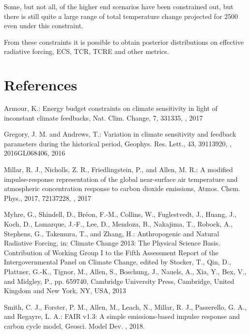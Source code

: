 \documentclass[letterpaper,10pt,english]{sphinxmanual}
\begin{document}
\noindent{}

Some, but not all, of the higher end scenarios have been constrained
out, but there is still quite a large range of total temperature change
projected for 2500 even under this constraint.

From these constraints it is possible to obtain posterior distributions
on effective radiative forcing, ECS, TCR, TCRE and other metrics.


\chapter{References}
\label{\detokenize{references:references}}\label{\detokenize{references::doc}}
Armour, K.: Energy budget constraints on climate sensitivity in light of inconstant climate feedbacks, Nat. Clim. Change, 7, 331\textendash{}335, , 2017

Gregory, J. M. and Andrews, T.: Variation in climate sensitivity and feedback parameters during the historical period, Geophys. Res. Lett.,
43, 3911\textendash{}3920, , 2016GL068406, 2016

Millar, R. J., Nicholls, Z. R., Friedlingstein, P., and Allen, M. R.: A modified impulse-response representation of the global near-surface air temperature and atmospheric concentration response to carbon dioxide emissions, Atmos. Chem. Phys., 2017, 7213\textendash{}7228,
, 2017

Myhre, G., Shindell, D., Bréon, F.-M., Collins, W., Fuglestvedt, J., Huang, J., Koch, D., Lamarque, J.-F., Lee, D., Mendoza, B., Nakajima, T., Robock, A., Stephens, G., Takemura, T., and Zhang, H.: Anthropogenic and Natural Radiative Forcing, in: Climate Change 2013: The Physical Science Basis. Contribution of Working Group I to the Fifth Assessment Report of the Intergovernmental Panel on Climate Change, edited by Stocker, T., Qin, D., Plattner, G.-K., Tignor, M., Allen, S., Boschung, J., Nauels, A., Xia, Y., Bex, V., and Midgley, P., pp. 659\textendash{}740, Cambridge University Press, Cambridge, United Kingdom and New York, NY, USA, 2013

Smith, C. J., Forster, P. M., Allen, M., Leach, N., Millar, R. J., Passerello, G. A., and Regayre, L. A.: FAIR v1.3: A simple emissions-based impulse response and carbon cycle model, Geosci. Model Dev. , 2018.



\renewcommand{\indexname}{Index}
\printindex
\end{document}
